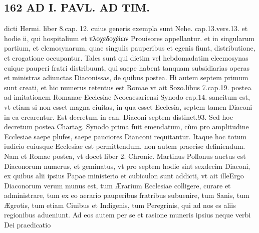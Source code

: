 \documentclass{article}
\begin{document}
\begin{pages}
\section*{162 AD I. PAVL. AD TIM. }\pstart dicti Hermi. liber  8.cap. 12. cuius generis exempla sunt Nehe. cap.13.vers.13. et hodie ii, qui hospitalium et πλοχεδοχέίων Prouisores appellantur. et in singularum partium, et elemosynarum, quae singulis pauperibus et egenis fiunt, distributione, et erogatione occupantur. Tales sunt qui dietim vel hebdomadatim eleemosynas cuique  pauperi fratri distribuunt, qui saepe habent tanquam subsidiarias operas et ministras adiunctas Diaconissas, de quibus postea. Hi autem septem primum sunt creati, et hic numerus retentus est Romae vt ait Sozo.libus  7.cap.19. postea ad imitationem Romanae Ecclesiae Neocaesariensi Synodo cap.14. sancitum est, vt etiam si non esset magna ciuitas, in qua esset Ecclesia, septem tamen Diaconi in ea crearentur. Est decretum in can. Diaconi septem distinct.93. Sed hoc decretum postea Chartag. Synodo prima fuit emendatum, cùm pro amplitudine Ecclesiae saepe plufes, saepe pauciores Dianconi requitantur. Itaque hoc totum iudicio cuiusque Ecclesiae est permittendum, non autem praecise definiendum. Nam et Romae postea, vt docet liber 2. Chronic. Martinus Pollonus auctus est Diaconorum numerus, et geminatus, vt pro septem hodie sint sexdecim Diaconi, ex quibus alii ipsius Papae ministerio et cubiculon sunt addicti, vt ait illeErgo Diaconorum verum munus est, tum Ærarium Ecclesiae colligere, curare et administrare, tum ex eo aerario pauperibus fratribus subuenire, tum Sanis, tum Ægrotis, tum etiam Ciuibus et Indigenis, tum Peregrinis, qui ad nos es aliis regionibus adueniunt. Ad eos autem per se et rasione muneris ipsius neque verbi Dei praedicatio  \pend

\end{pages}
\end{document}
